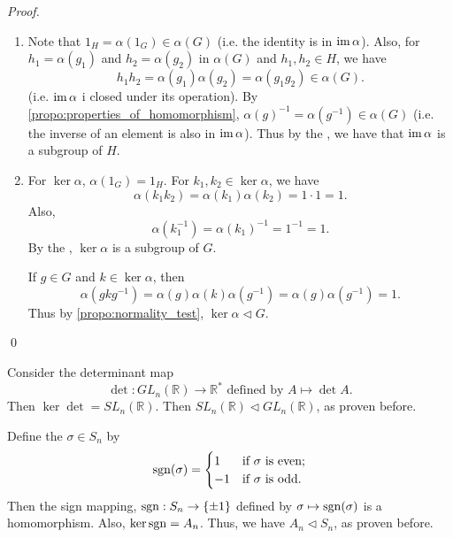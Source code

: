 \begin{proof}
  \begin{enumerate}
    \item Note that $1_H = \alpha(1_G) \in \alpha(G)$ (i.e. the identity is in $\operatorname{im} \alpha$). Also, for $h_1 = \alpha(g_1)$ and $h_2 = \alpha(g_2)$ in $\alpha(G)$ and $h_1, h_2 \in H$, we have
      \begin{equation*}
        h_1 h_2 = \alpha(g_1) \alpha(g_2) = \alpha(g_1 g_2) \in \alpha(G).
      \end{equation*}
      (i.e. $\operatorname{im} \alpha$ i closed under its operation). By \cref{propo:properties_of_homomorphism}, $\alpha(g)^{-1} = \alpha(g^{-1}) \in \alpha(G)$ (i.e. the inverse of an element is also in $\operatorname{im} \alpha$). Thus by the , we have that $\operatorname{im} \alpha$ is a subgroup of $H$.

    \item For $\ker \alpha$, $\alpha(1_G) = 1_H$. For $k_1, k_2 \in \ker \alpha$, we have
      \begin{equation*}
        \alpha(k_1 k_2) = \alpha(k_1) \alpha(k_2) = 1 \cdot 1 = 1.
      \end{equation*}
      Also,
      \begin{equation*}
        \alpha(k_1^{-1}) = \alpha(k_1)^{-1} = 1^{-1} = 1.
      \end{equation*}
      By the , $\ker \alpha$ is a subgroup of $G$.

      If $g \in G$ and $k \in \ker \alpha$, then
      \begin{equation*}
        \alpha(gkg^{-1}) = \alpha(g) \alpha(k) \alpha(g^{-1}) = \alpha(g) \alpha(g^{-1}) = 1.
      \end{equation*}
      Thus by \cref{propo:normality_test}, $\ker \alpha \triangleleft G$.
  \end{enumerate}\qed
\end{proof}

\begin{eg}
  Consider the determinant map
  \begin{equation*}
    \det : GL_n(\mathbb{R}) \to \mathbb{R}^* \text{ defined by } A \mapsto \det A.
  \end{equation*}
  Then $\ker \det = SL_n(\mathbb{R})$. Then $SL_n(\mathbb{R}) \triangleleft GL_n(\mathbb{R})$, as proven before.
\end{eg}

\begin{eg}
  Define the  $\sigma \in S_n$ by
  \begin{equation*}
    \operatorname{sgn}(\sigma) = \begin{cases}
      1 & \text{if } \sigma \text{ is even;} \\
      -1 & \text{if } \sigma \text{ is odd.}
    \end{cases}
  \end{equation*}
  Then the sign mapping, $\operatorname{sgn} : S_n \to \{\pm 1\}$ defined by $\sigma \mapsto \operatorname{sgn}(\sigma)$ is a homomorphism. Also, $\ker \operatorname{sgn} = A_n$. Thus, we have $A_n \triangleleft S_n$, as proven before.
\end{eg}

